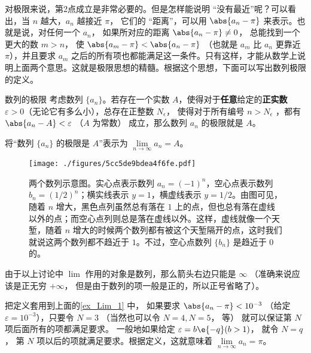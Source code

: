 对极限来说，第2点成立是非常必要的。但是怎样能说明 “没有最近”呢？可以看出，当 $n$ 越大，$a_n$ 越接近 $\pi$， 它们的 “距离”，可以用 $\abs{a_n - \pi}$ 来表示。也就是说，对任何一个 $a_n$， 如果所对应的距离 $\abs{a_n - \pi } \ne 0$， 总能找到一个更大的数 $m>n$， 使 $\abs{a_m - \pi} < \abs{a_n - \pi}$ （也就是 $a_m$ 比 $a_n$ 更靠近 $\pi$），并且要求 $a_m$ 之后的所有项也都能满足这一条件。只有这样，才能从数学上说明上面两个意思。这就是极限思想的精髓。根据这个思想，下面可以写出数列极限的定义。



\begin{definition}{数列的极限}\label{def_Lim_2}
考虑数列 $\{a_n\}$。若存在一个实数 $A$，使得对于\textbf{任意}给定的\textbf{正实数} $\varepsilon > 0$（无论它有多么小），总存在正整数 $N_\epsilon$， 使得对于所有编号 $n>N_\epsilon$ ，都有 $\abs{a_n - A} < \varepsilon$ （$A$ 为常数） 成立，那么数列 $a_n$ 的极限就是 $A$。

将“数列 $\{a_n\}$ 的极限是 $A$”表示为 $\lim\limits_{n\to\infty}a_n=A$。
\end{definition}
 
\begin{figure}[ht]
\centering
\texttt{[image: ./figures/5cc5de9bdea4f6fe.pdf]}
\caption{两个数列示意图。实心点表示数列 $a_n=(-1)^{n}$，空心点表示数列 $b_n=(1/2)^n$；横实线表示 $y=1$，横虚线表示 $y=1/2$。由图可见，随着 $n$ 增大，黑色点列虽然总有落在 $1$ 上的点，但也总有落在虚线以外的点；而空心点列则总是落在虚线以外。这样，虚线就像一个天堑，随着 $n$ 增大的时候两个数列都有被这个天堑隔开的点，这时我们就说这两个数列都不趋近于 $1$。不过，空心点数列 $\{b_n\}$ 是趋近于 $0$ 的。} \label{fig_Lim_1}
\end{figure}


由于以上讨论中 $\lim$ 作用的对象是数列，那么箭头右边只能是 $\infty$ （准确来说应该是正无穷 $+\infty$， 但是由于数列的项一般是正的，所以正号省略了）。

把定义套用到上面的\autoref{ex_Lim_1} 中， 如果要求 $\abs{a_n - \pi} < 10^{-3}$ （给定 $\varepsilon  = 10^{-3}$），只要令 $N=3$ （当然也可以令 $N=4, N=5$， 等） 就可以保证第 $N$ 项后面所有的项都满足要求。 一般地如果给定 $\varepsilon  = b\e{-q}  (b > 1)$， 就令 $N = q$， 第 $N$ 项以后的项就满足要求。根据定义，这就意味着 $\lim\limits_{n \to \infty } a_n = \pi$。 

